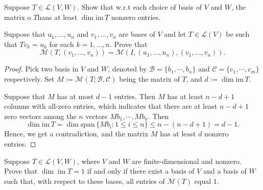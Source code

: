 \documentclass{article}
\begin{document}
\begin{problem}[3C-1]
    Suppose \( T\in \mathcal{L }(V,W) \). Show that w.r.t each choice of basis of \( V \) and \( W \), the matrix o \( T  \)hans at least \( \dim\mathrm{im}\,T  \) nonzero entries.
\end{problem}

\begin{problem}[3D-14]
    Suppose that \( u_1,\ldots,u_n \) and \( v_1,\ldots,v_n \) are bases of \( V \) and let \( T\in\mathcal{L}(V) \) be such that \( Tv_k=u_k \) for each \( k=1,\ldots,n \). Prove that
    \[ \mathcal{M}(T,(v_1,\ldots,v_n))=\mathcal{M}(I,(u_1,\ldots,u_n),(v_1,\ldots,v_n)). \]
\end{problem}

\begin{proof}
    Pick two basis in \( V \) and \( W \), denoted by \( \mathcal{B}=\{b_1,\cdots,b_n\} \) and \( \mathcal{C}=\{c_1,\cdots,c_m\} \) respectively. Set \( M:=\mathcal{M }(T;\mathcal{B},\mathcal{C }) \) being the matrix of \( T  \), and \( d:=\dim\mathrm{im}\,T  \). \par
    Suppose that \( M  \) has at most \( d-1 \) entries. Then \( M  \) has at least \( n-d+1 \) columns with all-zero entries, which indicates that there are at least \( n-d+1 \) zero vectors among the \( n \) vectors \( Mb_1,\cdots,Mb_n \). Then 
    \[ \dim\mathrm{im}\,T=\dim\mathrm{span}\,\{Mb_i:1\le i\le n\}\le n-(n-d+1)=d-1. \] 
    Hence, we get a contradiction, and the matrix \( M  \) has at least \( d \) nonzero entries.
\end{proof}

\begin{problem}[3C-2]
    Suppose \( T\in\mathcal{L}(V,W) \), where \( V \) and \( W \) are finite-dimensional and nonzero. Prove that \( \dim\operatorname{im } T=1 \) if and only if there exist a basis of \( V \) and a basis of \( W \) such that, with respect to these bases, all entries of \( \mathcal{M}(T) \) equal \(1\).
\end{problem}
\end{document}
